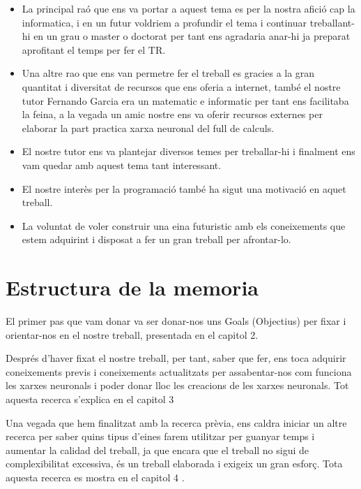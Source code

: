 \begin{itemize}
 \item La principal raó que ens va portar a aquest tema es per la nostra afició cap la informatica, i en un futur voldriem a profundir el tema i continuar treballant-hi en un grau o master o doctorat per tant ens agradaria anar-hi ja preparat aprofitant el temps per fer el TR.

 \item Una altre rao que ens van permetre fer el treball es gracies a la gran quantitat i diversitat de  recursos que ens oferia a internet, també el nostre tutor Fernando Garcia era un matematic e informatic per tant ens facilitaba la feina, a la vegada un amic nostre ens va oferir recursos externes per elaborar la part practica xarxa neuronal del full de calculs.

 \item El nostre tutor ens va plantejar diversos temes per treballar-hi i finalment ens vam quedar amb aquest tema tant interessant.

 \item El nostre interès per la programació també ha sigut una motivació en aquet treball.

 \item La voluntat de voler construir una eina futuristic amb els coneixements que estem adquirint i disposat a fer un gran treball per afrontar-lo.

\end{itemize}


\section{Estructura de la memoria}

El primer pas que vam donar va ser donar-nos uns Goals (Objectius) per fixar i orientar-nos en el nostre treball, presentada en el capitol 2.

Després d'haver fixat el nostre treball, per tant, saber que fer, ens toca adquirir coneixements previs i coneixements actualitzats per assabentar-nos com funciona les xarxes neuronals i poder donar lloc les creacions de les xarxes neuronals. Tot aquesta recerca s'explica en el capitol 3 

Una vegada que hem finalitzat amb la recerca prèvia, ens caldra iniciar un altre recerca per saber quins tipus d'eines farem utilitzar per guanyar temps i aumentar la calidad del treball, ja que encara que el treball no sigui de complexibilitat excessiva, és un treball elaborada i exigeix un gran esforç. Tota aquesta recerca es mostra en el capitol 4 .

